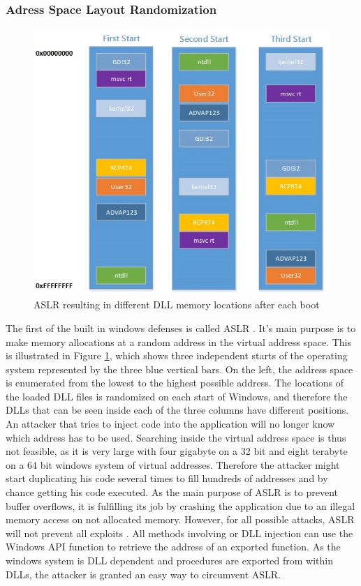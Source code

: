 \subsubsection{Adress Space Layout Randomization}
\label{sec:aslr}
\begin{figure}[!htbp]
\centering
\includegraphics[width=\textwidth,height=\textheight,keepaspectratio]{sections/background/defenses/aslr.jpg}
\caption{\gls{ASLR} resulting in different DLL memory locations after each boot}
\label{fig:aslr}
\end{figure}
The first of the built in windows defenses is called \gls{ASLR} \cite{miller2009method}. It's main purpose is to make memory allocations at a random address in the virtual address space. This is illustrated in Figure \ref{fig:aslr}, which shows three independent starts of the operating system represented by the three blue vertical bars. On the left, the address space is enumerated from the lowest to the highest possible address. The locations of the loaded \gls{DLL} files is randomized on each start of Windows, and therefore the \glspl{DLL} that can be seen inside each of the three columns have different positions. An attacker that tries to inject code into the application will no longer know which address has to be used. Searching inside the virtual address space is thus not feasible, as it is very large with four gigabyte on a 32 bit and eight terabyte on a 64 bit windows system of virtual addresses. Therefore the attacker might start duplicating his code several times to fill hundreds of addresses and by chance getting his code executed. As the main purpose of \gls{ASLR} is to prevent buffer overflows, it is fulfilling its job by crashing the application due to an illegal memory access on not allocated memory. However, for all possible attacks, \gls{ASLR} will not prevent all exploits \cite{shacham}. All methods involving  or \gls{DLL} injection can use the Windows \gls{API} function  to retrieve the address of an exported function. As the windows system is \gls{DLL} dependent and procedures are exported from within \glspl{DLL}, the attacker is granted an easy way to circumvent \gls{ASLR}.